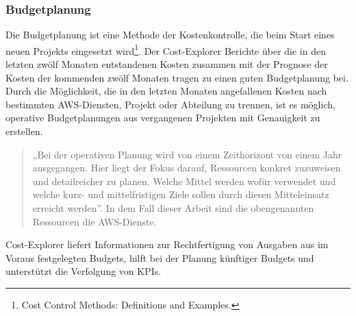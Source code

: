 
\subsubsection*{Budgetplanung}
Die Budgetplanung ist eine Methode der Kostenkontrolle, die beim Start eines neuen Projekts eingesetzt wird\footnote{Cost Control Methods: Definitions and Examples\cite{BUD2}.}. Der Cost-Explorer Berichte über die in den letzten zwölf Monaten entstandenen Kosten zusammen mit der Prognose der Kosten der kommenden zwölf Monaten tragen zu einen guten Budgetplanung bei.
Durch die Möglichkeit, die in den letzten Monaten angefallenen Kosten nach bestimmten AWS-Diensten, Projekt oder Abteilung zu trennen, ist es möglich, operative Budgetplanungen aus vergangenen Projekten mit Genauigkeit zu erstellen. 
\begin{quote}
  „Bei der operativen Planung wird von einem Zeithorizont von einem Jahr ausgegangen. Hier liegt der Fokus darauf, Ressourcen konkret zuzuweisen und detailreicher zu planen. Welche Mittel werden wofür verwendet und welche kurz- und mittelfristigen Ziele sollen durch diesen Mitteleinsatz erreicht werden”\cite{BUD1}.
  In dem Fall dieser Arbeit sind die obengenannten Ressourcen die AWS-Dienste.
\end{quote}
Cost-Explorer liefert Informationen zur Rechtfertigung von Ausgaben aus im Voraus festgelegten Budgets, hilft bei der Planung künftiger Budgets und unterstützt die Verfolgung von KPIs.

